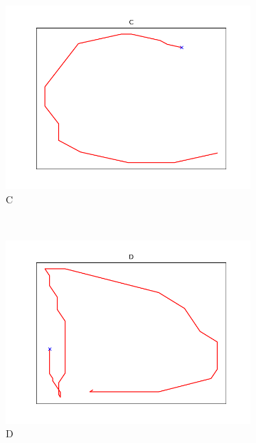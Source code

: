 \begin{figure}
\begin{subfigure}[b]{0.14\textwidth}
        \includegraphics[width=\textwidth]{images/gbem/letters_generated/C.png}
        \caption{C}
    \end{subfigure}
    ~
    \begin{subfigure}[b]{0.14\textwidth}
        \includegraphics[width=\textwidth]{images/gbem/letters_generated/D.png}
        \caption{D}
    \end{subfigure}
    ~
    \begin{subfigure}[b]{0.14\textwidth}

\end{subfigure}
\end{figure}
